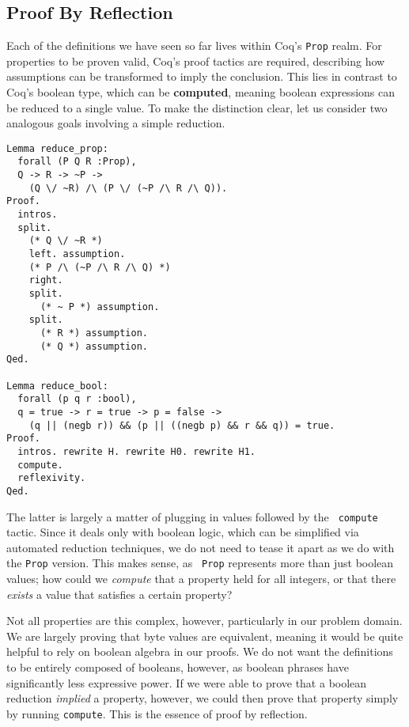 \documentclass[nocopyrightspace,preprint]{sigplanconf}
\begin{document}
\subsection{Proof By Reflection}
\label{subsec:reflection}

Each of the definitions we have seen so far lives within Coq's {\tt Prop}
realm. For properties to be proven valid, Coq's proof tactics are required,
describing how assumptions can be transformed to imply the conclusion. This
lies in contrast to Coq's boolean type, which can be {\bf computed}, meaning
boolean expressions can be reduced to a single value. To make the distinction
clear, let us consider two analogous goals involving a simple reduction.

\begin{lstlisting}
Lemma reduce_prop:
  forall (P Q R :Prop),
  Q -> R -> ~P ->
    (Q \/ ~R) /\ (P \/ (~P /\ R /\ Q)).
Proof.
  intros.
  split.
    (* Q \/ ~R *)
    left. assumption.
    (* P /\ (~P /\ R /\ Q) *)
    right. 
    split.
      (* ~ P *) assumption.
    split.
      (* R *) assumption.
      (* Q *) assumption.
Qed.

Lemma reduce_bool:
  forall (p q r :bool),
  q = true -> r = true -> p = false ->
    (q || (negb r)) && (p || ((negb p) && r && q)) = true.
Proof.
  intros. rewrite H. rewrite H0. rewrite H1.
  compute.
  reflexivity.
Qed.
\end{lstlisting}

The latter is largely a matter of plugging in values followed by the {\tt
compute} tactic. Since it deals only with boolean logic, which can be
simplified via automated reduction techniques\cite{coq-cbv}, we do not need to
tease it apart as we do with the {\tt Prop} version. This makes sense, as {\tt
Prop} represents more than just boolean values; how could we {\em compute}
that a property held for all integers, or that there {\em exists} a value that
satisfies a certain property?

Not all properties are this complex, however, particularly in our problem
domain. We are largely proving that byte values are equivalent, meaning it
would be quite helpful to rely on boolean algebra in our proofs. We do not
want the definitions to be entirely composed of booleans, however, as boolean
phrases have significantly less expressive power. If we were able to prove
that a boolean reduction {\em implied} a property, however, we could then
prove that property simply by running {\tt compute}. This is the essence of
proof by reflection. 
\end{document}
